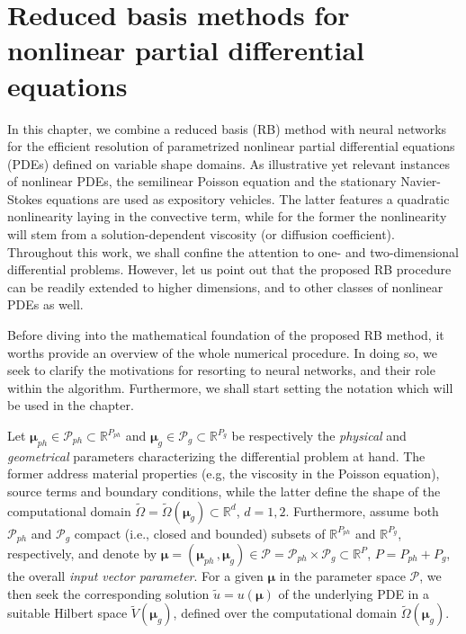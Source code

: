 \documentclass[12pt, a4paper, twoside, openright]{report}
\numberwithin{equation}{chapter}
\theoremstyle{theorem}
\theoremstyle{definition}
\theoremstyle{remark}
\theoremstyle{proposition}
\numberwithin{figure}{chapter}
\newcommand{\wt}[1]{\widetilde{#1}}
\begin{document}
		

	\chapter{Reduced basis methods for nonlinear partial differential equations}
	\label{chapter:Reduced Basis method for nonlinear partial differential equations}
			
		In this chapter, we combine a reduced basis (RB) method with neural networks for the efficient resolution of parametrized nonlinear partial differential equations (PDEs) defined on variable shape domains. As illustrative yet relevant instances of nonlinear PDEs, the semilinear Poisson equation and the stationary Navier-Stokes equations are used as expository vehicles. The latter features a quadratic nonlinearity laying in the convective term, while for the former the nonlinearity will stem from a solution-dependent viscosity (or diffusion coefficient). Throughout this work, we shall confine the attention to one- and two-dimensional differential problems. However, let us point out that the proposed RB procedure can be readily extended to higher dimensions, and to other classes of nonlinear PDEs as well.
		
		Before diving into the mathematical foundation of the proposed RB method, it worths provide an overview of the whole numerical procedure. In doing so, we seek to clarify the motivations for resorting to neural networks, and their role within the algorithm. Furthermore, we shall start setting the notation which will be used in the chapter.
		
		Let $\boldsymbol{\mu}_{ph} \in \mathcal{P}_{ph} \subset \mathbb{R}^{P_{ph}}$ and $\boldsymbol{\mu}_{g} \in \mathcal{P}_{g} \subset \mathbb{R}^{P_{g}}$ be respectively the \emph{physical} and \emph{geometrical} parameters characterizing the differential problem at hand. The former address material properties (e.g, the viscosity in the Poisson equation), source terms and boundary conditions, while the latter define the shape of the computational domain $\wt{\Omega} = \wt{\Omega}(\boldsymbol{\mu}_g) \subset \mathbb{R}^d$, $d = 1,2$. Furthermore, assume both $\mathcal{P}_{ph}$ and $\mathcal{P}_g$ compact (i.e., closed and bounded) subsets of  $\mathbb{R}^{P_{ph}}$ and $\mathbb{R}^{P_{g}}$, respectively, and denote by $\boldsymbol{\mu} = (\boldsymbol{\mu}_{ph} \, , \boldsymbol{\mu}_{g}) \in \mathcal{P} = \mathcal{P}_{ph} \times \mathcal{P}_g \subset \mathbb{R}^P$, $P = P_{ph} + P_g$, the overall \emph{input vector parameter}. For a given $\boldsymbol{\mu}$ in the parameter space $\mathcal{P}$, we then seek the corresponding solution $\wt{u} = {u}(\boldsymbol{\mu})$ of the underlying PDE in a suitable Hilbert space $\wt{V}(\boldsymbol{\mu}_g)$, defined over the computational domain $\wt{\Omega}(\boldsymbol{\mu}_g)$. 
		
\end{document}
